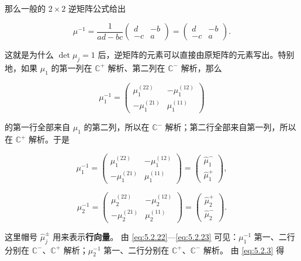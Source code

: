 \documentclass[
    lang=cn,
    scheme=chinese,
    mode=simple,
    device=normal,
    color=blue,
    math=cm,
    thmcnt=section,
    12pt
]{elegantbook}
\begin{document}
那么一般的 $2\times2$ 逆矩阵公式给出

\[
    \mu^{-1}
    =
    \dfrac{1}{ad-bc}
    \begin{pmatrix}
        d  & -b \\
        -c & a
    \end{pmatrix}
    =
    \begin{pmatrix}
        d  & -b \\
        -c & a
    \end{pmatrix}.
\]

这就是为什么 $\det\mu_j=1$ 后，逆矩阵的元素可以直接由原矩阵的元素写出。特别地，如果 $\mu_1$ 的第一列在 $\mathbb{C}^+$ 解析、第二列在 $\mathbb{C}^-$ 解析，那么

\[
    \mu_1^{-1}
    =
    \begin{pmatrix}
        \mu_1^{(22)}  & -\mu_1^{(12)} \\
        -\mu_1^{(21)} & \mu_1^{(11)}
    \end{pmatrix}
\]

的第一行全部来自 $\mu_1$ 的第二列，所以在 $\mathbb{C}^-$ 解析；第二行全部来自第一列，所以在 $\mathbb{C}^+$ 解析。于是

\begin{equation}
    \mu_1^{-1}
    =
    \begin{pmatrix}
        \mu_1^{(22)}  & -\mu_1^{(12)} \\
        -\mu_1^{(21)} & \mu_1^{(11)}
    \end{pmatrix}
    =
    \begin{pmatrix}
        \widehat\mu_1^- \\
        \widehat\mu_1^+
    \end{pmatrix},
    \tag{5.2.22}
    \label{eq:5.2.22}
\end{equation}

\begin{equation}
    \mu_2^{-1}
    =
    \begin{pmatrix}
        \mu_2^{(22)}  & -\mu_2^{(12)} \\
        -\mu_2^{(21)} & \mu_2^{(11)}
    \end{pmatrix}
    =
    \begin{pmatrix}
        \widehat\mu_2^+ \\
        \widehat\mu_2^-
    \end{pmatrix}.
    \tag{5.2.23}
    \label{eq:5.2.23}
\end{equation}

这里帽号 $\widehat\mu_j^\pm$ 用来表示\textbf{行向量}。
由 \eqref{eq:5.2.22}---\eqref{eq:5.2.23} 可见：$\mu_1^{-1}$ 第一、二行分别在 $\mathbb{C}^-$、$\mathbb{C}^+$ 解析；$\mu_2^{-1}$ 第一、二行分别在 $\mathbb{C}^+$、$\mathbb{C}^-$ 解析。
由 \eqref{eq:5.2.3} 得
\end{document}

